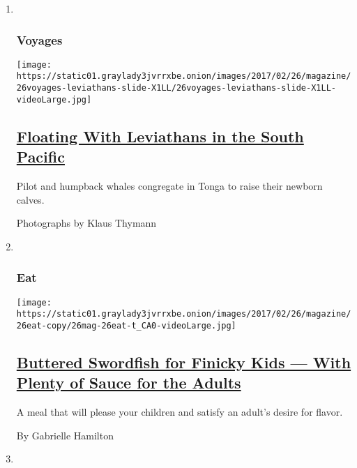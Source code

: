 \begin{enumerate}
\def\labelenumi{\arabic{enumi}.}
\item ~
  \hypertarget{voyages}{%
  \subsubsection{Voyages}\label{voyages}}

  \texttt{[image: https://static01.graylady3jvrrxbe.onion/images/2017/02/26/magazine/26voyages-leviathans-slide-X1LL/26voyages-leviathans-slide-X1LL-videoLarge.jpg]}

  \hypertarget{floating-with-leviathans-in-the-south-pacific}{%
  \subsection{\texorpdfstring{\href{/interactive/2017/02/24/magazine/voyages-pilot-humpback-whales-tonga.html}{Floating
  With Leviathans in the South
  Pacific}}{Floating With Leviathans in the South Pacific}}\label{floating-with-leviathans-in-the-south-pacific}}

  Pilot and humpback whales congregate in Tonga to raise their newborn
  calves.

  Photographs by Klaus Thymann
\item ~
  \hypertarget{eat}{%
  \subsubsection{Eat}\label{eat}}

  \texttt{[image: https://static01.graylady3jvrrxbe.onion/images/2017/02/26/magazine/26eat-copy/26mag-26eat-t\_CA0-videoLarge.jpg]}

  \hypertarget{buttered-swordfish-for-finicky-kids--with-plenty-of-sauce-for-the-adults}{%
  \subsection{\texorpdfstring{\href{/2017/02/24/magazine/buttered-swordfish-for-finicky-kids-with-plenty-of-sauce-for-the-adults.html}{Buttered
  Swordfish for Finicky Kids --- With Plenty of Sauce for the
  Adults}}{Buttered Swordfish for Finicky Kids --- With Plenty of Sauce for the Adults}}\label{buttered-swordfish-for-finicky-kids--with-plenty-of-sauce-for-the-adults}}

  A meal that will please your children and satisfy an adult's desire
  for flavor.

  By Gabrielle Hamilton
\item ~
  \hypertarget{drink}{%
}
\end{enumerate}

